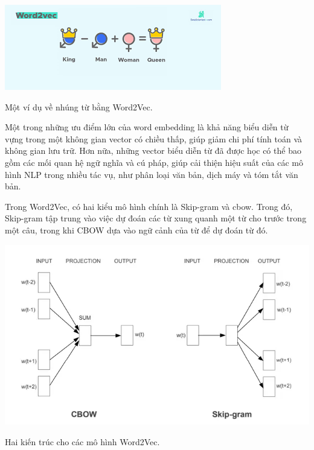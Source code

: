 \documentclass[a4paper, 12pt, openany]{book}
\begin{document}
\begin{minipage}{\linewidth}
    \captionsetup{type=figure}
    \centering
    \includegraphics[width=.8\linewidth]{./assets/images/word2vec-intro.png}
    \caption{Một ví dụ về nhúng từ bằng Word2Vec.}
\end{minipage}
\vspace{0.5cm}

Một trong những ưu điểm lớn của word embedding là khả năng biểu diễn từ vựng trong một không gian vector có chiều thấp, giúp giảm chi phí tính toán và không gian lưu trữ. Hơn nữa, những vector biểu diễn từ đã được học có thể bao gồm các mối quan hệ ngữ nghĩa và cú pháp, giúp cải thiện hiệu suất của các mô hình NLP trong nhiều tác vụ, như phân loại văn bản, dịch máy và tóm tắt văn bản.

Trong Word2Vec, có hai kiểu mô hình chính là Skip-gram và \ac{cbow}. Trong đó, Skip-gram tập trung vào việc dự đoán các từ xung quanh một từ cho trước trong một câu, trong khi CBOW dựa vào ngữ cảnh của từ để dự đoán từ đó.

\begin{minipage}{\linewidth}
    \captionsetup{type=figure}
    \centering
    \includegraphics[width=\linewidth]{./assets/images/word2vec.png}
    \caption{Hai kiến trúc cho các mô hình Word2Vec.}
\end{minipage}
\vspace{0.5cm}
\end{document}
